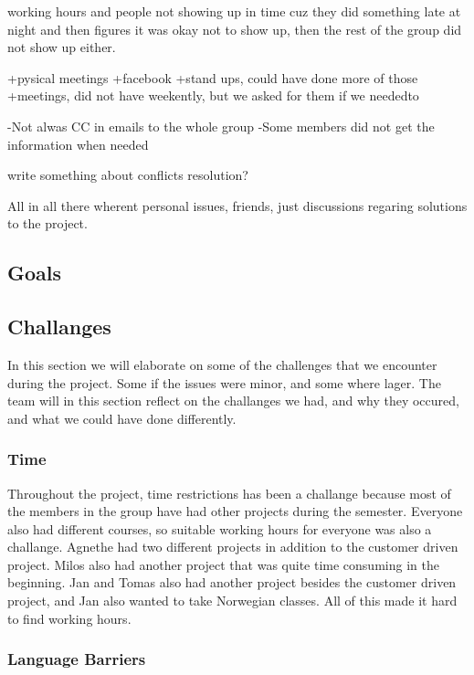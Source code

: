 working hours and people not showing up in time cuz they did something late at night and then figures it was okay not to show up, then the rest of the group did not show up either.


+pysical meetings
+facebook
+stand ups, could have done more of those
+meetings, did not have weekently, but we asked for them if we neededto

-Not alwas CC in emails to the whole group
-Some members did not get the information when needed 


write something about conflicts resolution?

All in all there wherent personal issues, friends, just discussions regaring solutions to the project. 

\subsection{Goals} 


\subsection{Challanges}

In this section we will elaborate on some of the challenges that we encounter during the project. Some if the issues were minor, and some where lager. The team will in this section reflect on the challanges we had, and why they occured, and what we could have done differently.

\subsubsection{Time}

Throughout the project, time restrictions has been a challange because most of the members in the group have had other projects during the semester. Everyone also had different courses, so suitable working hours for everyone was also a challange. Agnethe had two different projects in addition to the customer driven project. Milos also had another project that was quite time consuming in the beginning. Jan and Tomas also had another project besides the customer driven project, and Jan also wanted to take Norwegian classes. All of this made it hard to find working hours. 

\subsubsection{Language Barriers}


